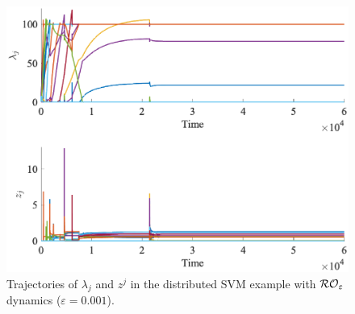 \documentclass[journal,twoside,web]{ieeecolor}
\begin{document}
\begin{figure}
\begin{center}
\includegraphics[scale = 0.45]{trajectories_4_perturbed_eps0.001.eps}
\caption{Trajectories of $\lambda_j$ and $z^j$ in the distributed SVM example with ${\cal RO}_\varepsilon$ dynamics ($\varepsilon=0.001$).}
\label{trajectories_4_perturbed}
\end{center}
\vspace{0mm}
\end{figure}


\fi
\end{document}
